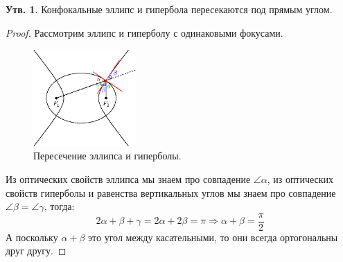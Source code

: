 \documentclass[12pt]{article}
\theoremstyle{definition}
\newtheorem{prop}{Утв.}
\begin{document}
\begin{prop}
	Конфокальные эллипс и гипербола пересекаются под прямым углом.
\end{prop}
\begin{proof}
	Рассмотрим эллипс и гиперболу с одинаковыми фокусами.
	\begin{figure}[H]
		\centering
		\includegraphics[width=0.35\textwidth]{ANGL2_16.eps}
		\caption{Пересечение эллипса и гиперболы.}
		\label{2_16}
	\end{figure}
	Из оптических свойств эллипса мы знаем про совпадение $\angle \alpha$, из оптических свойств гиперболы и равенства вертикальных углов мы знаем про совпадение $\angle \beta = \angle \gamma$, тогда:
	$$
		2\alpha + \beta + \gamma  = 2 \alpha + 2\beta = \pi \Rightarrow \alpha + \beta = \dfrac{\pi}{2}
	$$
	А поскольку $\alpha + \beta$ это угол между касательными, то они всегда ортогональны друг другу.
\end{proof}
\end{document}
